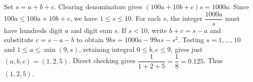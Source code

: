 Set $s=a+b+c$. Clearing denominators gives $(100a+10b+c)s=1000a$. Since $100a\le100a+10b+c$, we have $1\le s\le10$. For each $s$, the integer $\dfrac{1000a}{s}$ must have hundreds digit $a$ and digit sum $s$. If $s<10$, write $b+c=s-a$ and substitute $c=s-a-b$ to obtain $9bs=1000a-99as-s^2$. Testing $s=1,\ldots,10$ and $1\le a\le\min(9,s)$, retaining integral $0\le b,c\le9$, gives just $(a,b,c)=(1,2,5)$. Direct checking gives $\dfrac{1}{1+2+5}=\dfrac{1}{8}=0.125$. Thus $\boxed{(1,2,5)}$.
